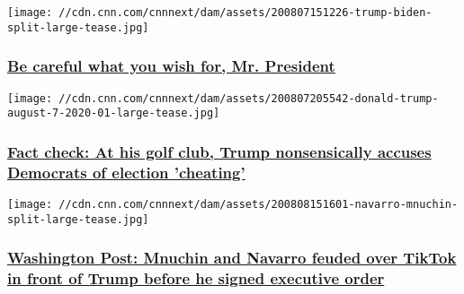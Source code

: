 \href{/2020/08/08/opinions/trump-fourth-debate-request-zelizer/index.html}{}

\texttt{[image: //cdn.cnn.com/cnnnext/dam/assets/200807151226-trump-biden-split-large-tease.jpg]}

\hypertarget{be-careful-what-you-wish-for-mr-president}{%
\subsubsection{\texorpdfstring{\href{/2020/08/08/opinions/trump-fourth-debate-request-zelizer/index.html}{Be
careful what you wish for, Mr.
President}}{Be careful what you wish for, Mr. President}}\label{be-careful-what-you-wish-for-mr-president}}

\href{/2020/08/07/politics/donald-trump-press-briefing-democrats-cheating-election-fact-check/index.html}{}

\texttt{[image: //cdn.cnn.com/cnnnext/dam/assets/200807205542-donald-trump-august-7-2020-01-large-tease.jpg]}

\hypertarget{fact-check-at-his-golf-club-trump-nonsensically-accuses-democrats-of-election-cheating-}{%
\subsubsection{\texorpdfstring{\href{/2020/08/07/politics/donald-trump-press-briefing-democrats-cheating-election-fact-check/index.html}{Fact
check: At his golf club, Trump nonsensically accuses Democrats of
election 'cheating'
}}{Fact check: At his golf club, Trump nonsensically accuses Democrats of election 'cheating' }}\label{fact-check-at-his-golf-club-trump-nonsensically-accuses-democrats-of-election-cheating-}}

\href{/2020/08/08/politics/mnuchin-navarro-tiktok/index.html}{}

\texttt{[image: //cdn.cnn.com/cnnnext/dam/assets/200808151601-navarro-mnuchin-split-large-tease.jpg]}

\hypertarget{washington-post-mnuchin-and-navarro-feuded-over-tiktok-in-front-of-trump-before-he-signed-executive-order}{%
\subsubsection{\texorpdfstring{\href{/2020/08/08/politics/mnuchin-navarro-tiktok/index.html}{Washington
Post: Mnuchin and Navarro feuded over TikTok in front of Trump before he
signed executive
order}}{Washington Post: Mnuchin and Navarro feuded over TikTok in front of Trump before he signed executive order}}\label{washington-post-mnuchin-and-navarro-feuded-over-tiktok-in-front-of-trump-before-he-signed-executive-order}}

